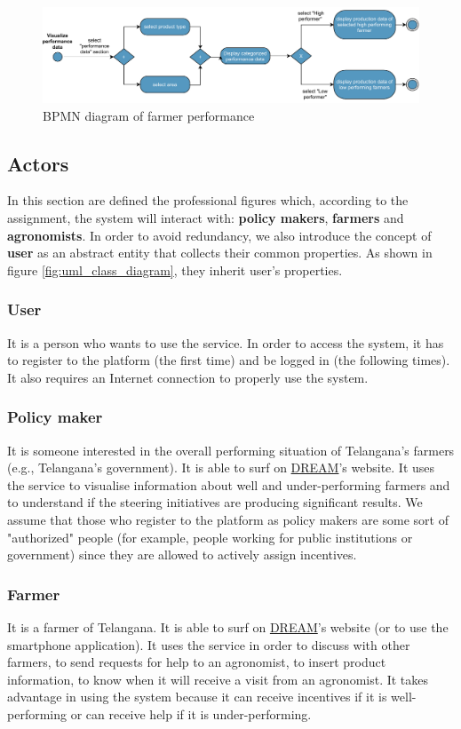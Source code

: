 \begin{figure}[H]
	\centering
    \includegraphics[width=\textwidth]{Images/BPMN/Performance.pdf}
	\caption{\label{fig:bpmn_performance}BPMN diagram of farmer performance}
\end{figure}

\subsection{Actors}
\label{sec:actors}
In this section are defined the professional figures which, according to the assignment, the system will interact with: \textbf{policy makers}, \textbf{farmers} and \textbf{agronomists}. In order to avoid redundancy, we also introduce the concept of \textbf{user} as an abstract entity that collects their common properties. As shown in figure \ref{fig:uml_class_diagram}, they inherit user's properties.
\subsubsection{User}
It is a person who wants to use the service. In order to access the system, it has to register to the platform (the first time) and be logged in (the following times). It also requires an Internet connection to properly use the system.
\subsubsection{Policy maker}
It is someone interested in the overall performing situation of Telangana’s farmers (e.g., Telangana’s government). It is able to surf on \hyperref[tab:acronymsTable]{DREAM}’s website. It uses the service to visualise information about well and under-performing farmers and to understand if the steering initiatives are producing significant results. We assume that those who register to the platform as policy makers are some sort of "authorized" people (for example, people working for public institutions or government) since they are allowed to actively assign incentives.
\subsubsection{Farmer}
It is a farmer of Telangana. It is able to surf on \hyperref[tab:acronymsTable]{DREAM}’s website (or to use the smartphone application). It uses the service in order to discuss with other farmers, to send requests for help to an agronomist, to insert product information, to know when it will receive a visit from an agronomist. It takes advantage in using the system because it can receive incentives if it is well-performing or can receive help if it is under-performing.
